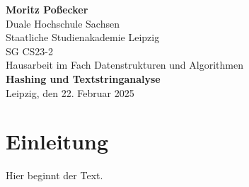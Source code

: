 \documentclass[a4paper,12pt]{article}
\begin{document}
\begin{titlepage}
    \centering
    \vfill
    {\Large \textbf{Moritz Poßecker} \\[1cm]}
    {\large Duale Hochschule Sachsen \\ Staatliche Studienakademie Leipzig \\ SG CS23-2 \\[2cm]}
    {\large Hausarbeit im Fach Datenstrukturen und Algorithmen \\[1.5cm]}
    {\LARGE \textbf{Hashing und Textstringanalyse} \\[8cm]}
    \flushright
    Leipzig, den 22. Februar 2025
\end{titlepage}

\section{Einleitung}
Hier beginnt der Text.
\end{document}
